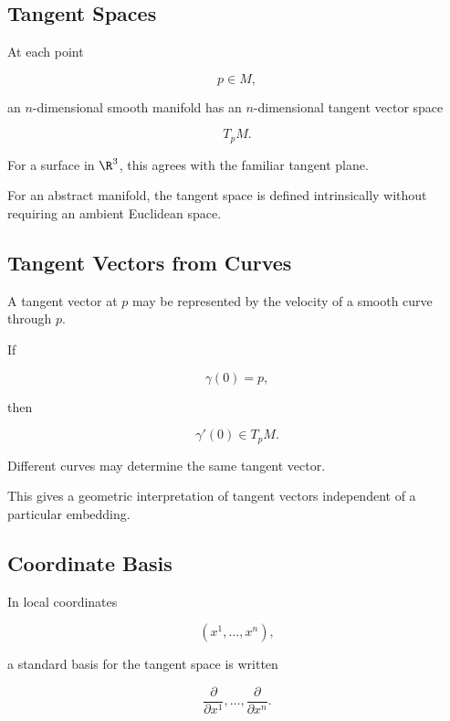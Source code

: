\subsection{Tangent Spaces}
\label{subsec:manifold-tangent-spaces}

At each point

\[
p\in M,
\]

an \(n\)-dimensional smooth manifold has an \(n\)-dimensional tangent vector
space

\[
\boxed{
T_pM.
}
\]

For a surface in \(\R^3\), this agrees with the familiar tangent plane.

For an abstract manifold, the tangent space is defined intrinsically without
requiring an ambient Euclidean space.

\subsection{Tangent Vectors from Curves}
\label{subsec:tangent-vectors-curves}

A tangent vector at \(p\) may be represented by the velocity of a smooth
curve through \(p\).

If

\[
\gamma(0)=p,
\]

then

\[
\boxed{
\gamma'(0)\in T_pM.
}
\]

Different curves may determine the same tangent vector.

This gives a geometric interpretation of tangent vectors independent of a
particular embedding.

\subsection{Coordinate Basis}
\label{subsec:coordinate-basis}

In local coordinates

\[
(x^1,\ldots,x^n),
\]

a standard basis for the tangent space is written

\[
\boxed{
\frac{\partial}{\partial x^1},
\ldots,
\frac{\partial}{\partial x^n}.
}
\]

